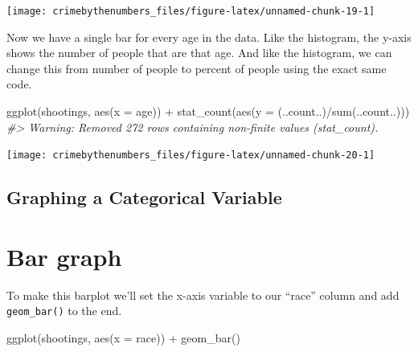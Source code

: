 \documentclass[
  12pt,
]{book}
\newenvironment{Shaded}{\begin{snugshade}}{\end{snugshade}}
\newcommand{\AttributeTok}[1]{\textcolor[rgb]{0.61,0.61,0.61}{#1}}
\newcommand{\CommentTok}[1]{\textcolor[rgb]{0.37,0.37,0.37}{\textit{#1}}}
\newcommand{\FunctionTok}[1]{\textcolor[rgb]{0,0,0}{#1}}
\newcommand{\NormalTok}[1]{#1}
\newcommand{\SpecialCharTok}[1]{\textcolor[rgb]{0,0,0}{#1}}
\begin{document}
\begin{center}\texttt{[image: crimebythenumbers\_files/figure-latex/unnamed-chunk-19-1]} \end{center}

Now we have a single bar for every age in the data. Like the histogram, the y-axis shows the number of people that are that age. And like the histogram, we can change this from number of people to percent of people using the exact same code.

\begin{Shaded}
\begin{Highlighting}[]
\FunctionTok{ggplot}\NormalTok{(shootings, }\FunctionTok{aes}\NormalTok{(}\AttributeTok{x =}\NormalTok{ age)) }\SpecialCharTok{+} 
  \FunctionTok{stat\_count}\NormalTok{(}\FunctionTok{aes}\NormalTok{(}\AttributeTok{y =}\NormalTok{ (..count..)}\SpecialCharTok{/}\FunctionTok{sum}\NormalTok{(..count..)))}
\CommentTok{\#\textgreater{} Warning: Removed 272 rows containing non{-}finite values (stat\_count).}
\end{Highlighting}
\end{Shaded}

\begin{center}\texttt{[image: crimebythenumbers\_files/figure-latex/unnamed-chunk-20-1]} \end{center}

\hypertarget{graphing-a-categorical-variable}{%
\subsection{Graphing a Categorical Variable}\label{graphing-a-categorical-variable}}

\hypertarget{bar-graph}{%
\section{Bar graph}\label{bar-graph}}

To make this barplot we'll set the x-axis variable to our ``race'' column and add \texttt{geom\_bar()} to the end.

\begin{Shaded}
\begin{Highlighting}[]
\FunctionTok{ggplot}\NormalTok{(shootings, }\FunctionTok{aes}\NormalTok{(}\AttributeTok{x =}\NormalTok{ race)) }\SpecialCharTok{+} 
  \FunctionTok{geom\_bar}\NormalTok{()}
\end{Highlighting}
\end{Shaded}
\end{document}
